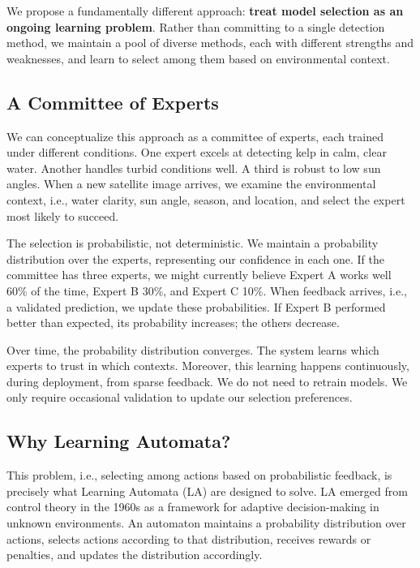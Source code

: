 \documentclass[11pt,a4paper]{article}
\begin{document}
We propose a fundamentally different approach: \textbf{treat model selection as an ongoing learning problem}. Rather than committing to a single detection method, we maintain a pool of diverse methods, each with different strengths and weaknesses, and learn to select among them based on environmental context.

\subsection{A Committee of Experts}

We can conceptualize this approach as a committee of experts, each trained under different conditions. One expert excels at detecting kelp in calm, clear water. Another handles turbid conditions well. A third is robust to low sun angles. When a new satellite image arrives, we examine the environmental context, i.e., water clarity, sun angle, season, and location, and select the expert most likely to succeed.

The selection is probabilistic, not deterministic. We maintain a probability distribution over the experts, representing our confidence in each one. If the committee has three experts, we might currently believe Expert A works well 60\% of the time, Expert B 30\%, and Expert C 10\%. When feedback arrives, i.e., a validated prediction, we update these probabilities. If Expert B performed better than expected, its probability increases; the others decrease.

Over time, the probability distribution converges. The system learns which experts to trust in which contexts. Moreover, this learning happens continuously, during deployment, from sparse feedback. We do not need to retrain models. We only require occasional validation to update our selection preferences.

\subsection{Why Learning Automata?}

This problem, i.e., selecting among actions based on probabilistic feedback, is precisely what Learning Automata (LA) are designed to solve. LA emerged from control theory in the 1960s as a framework for adaptive decision-making in unknown environments. An automaton maintains a probability distribution over actions, selects actions according to that distribution, receives rewards or penalties, and updates the distribution accordingly.
\end{document}
